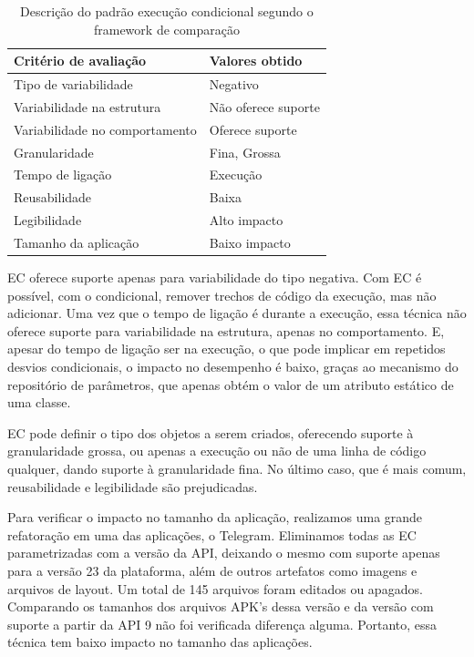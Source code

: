 \begin{table}[!htbp]
  \centering	
  \caption{Descrição do padrão execução condicional segundo o framework de comparação}
  \label{tab:fw_EC}
  \begin{tabular}{ | l | l |}
    \hline
    \textbf{Critério de avaliação} 	& \textbf{Valores obtido}  \\ \hline
    Tipo de variabilidade 			& Negativo  \\ \hline
    Variabilidade na estrutura 		& Não oferece suporte \\ \hline
    Variabilidade no comportamento 	& Oferece suporte \\ \hline
    Granularidade 					& Fina, Grossa \\ \hline
    Tempo de ligação 				& Execução \\ \hline
    Reusabilidade 					& Baixa \\ \hline
    Legibilidade 					& Alto impacto \\ \hline
    Tamanho da aplicação 			& Baixo impacto \\ \hline
  \end{tabular}
\end{table}

EC oferece suporte apenas para variabilidade do tipo negativa. Com EC é possível,
com o condicional, remover trechos de código da execução, mas não adicionar. Uma
vez que o tempo de ligação é durante a  execução, essa técnica não oferece suporte
para variabilidade na estrutura, apenas no comportamento. E, apesar do tempo de
ligação ser na execução, o que pode implicar em repetidos desvios condicionais,
o impacto no desempenho é baixo, graças ao mecanismo do repositório de parâmetros,
que apenas obtém o valor de um atributo estático de uma classe.

EC pode definir o tipo dos objetos a serem criados, oferecendo suporte à granularidade
grossa, ou apenas a execução ou não de uma linha de código qualquer, dando suporte à
granularidade fina. No último caso, que é mais comum,  reusabilidade e legibilidade
são prejudicadas. 

Para verificar o impacto no tamanho da aplicação, realizamos uma grande refatoração
em uma das aplicações, o Telegram. Eliminamos todas as EC parametrizadas com a versão
da API, deixando o mesmo com suporte apenas para a versão 23 da plataforma, além de
outros artefatos como imagens e arquivos de layout. Um total de 145 arquivos foram 
editados ou
apagados. Comparando os tamanhos dos arquivos APK's dessa versão e da versão com suporte
a partir da API 9 não foi verificada diferença alguma. Portanto, essa técnica tem baixo
impacto no tamanho das aplicações.

